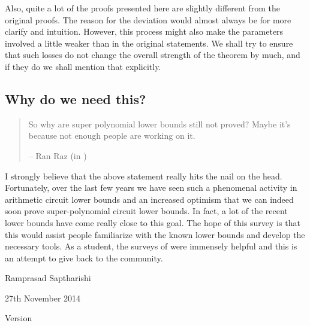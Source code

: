 Also, quite a lot of the proofs presented here are slightly different from the original proofs. The reason for the deviation would almost always be for more clarify and intuition. However, this process might also make the parameters involved a little weaker than in the original statements. We shall try to ensure that such losses do not change the overall strength of the theorem by much, and if they do we shall mention that explicitly. \\

\subsection*{Why do we need this?}

\begin{quote}
So why are super polynomial lower bounds still not proved?  Maybe it's because not enough people are working on it.  
\begin{flushright}
-- Ran Raz (in \cite{raz10fool})
\end{flushright}
\end{quote}


I strongly believe that the above statement really hits the nail on the head. Fortunately, over the last few years we have seen such a phenomenal activity in arithmetic circuit lower bounds and an increased optimism that we can indeed soon prove super-polynomial circuit lower bounds. In fact, a lot of the recent lower bounds have come really close to this goal. The hope of this survey is that this would assist people familiarize with the known lower bounds and develop the necessary tools. As a student, the surveys of \cite{sy,ckw11} were immensely helpful and this is an attempt to give back to the community. 

\vspace*{2cm}

\noindent
Ramprasad Saptharishi

\noindent
27th November 2014

\noindent 
Version \currentversion

